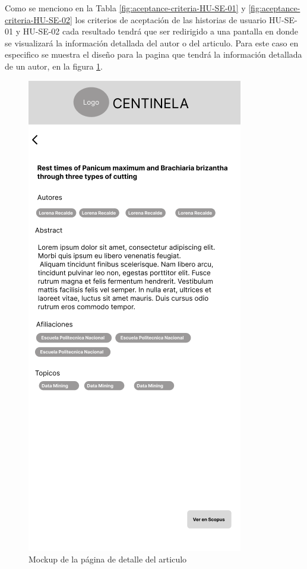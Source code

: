Como se menciono en la Tabla \ref{fig:aceptance-criteria-HU-SE-01} y \ref{fig:aceptance-criteria-HU-SE-02} los criterios de aceptación de las historias de usuario HU-SE-01 y HU-SE-02 cada resultado tendrá que ser redirigido a una pantalla en donde 
se visualizará la información detallada del autor o del articulo. Para este caso en especifico se muestra el diseño para la pagina que tendrá
la información detallada de un autor, en la figura \ref{fig:mockup-article-detail}.
\begin{figure}[H]
    \centering
    \includegraphics[scale=0.8]{../02Figures/02Chapter/Sprints/Sprint-1/article-detail.png}
    \caption{Mockup de la página de detalle del articulo}
    \label{fig:mockup-article-detail}
\end{figure}

